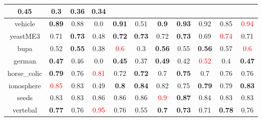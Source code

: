 \documentclass{article}%
\begin{document}
\begin{tabular}{c|cccccccccc}
{0.45
}&0.3&\textbf{0.36}&0.34\\%
\hline%
vehicle&\textbf{0.89}&0.88&0.0&\textbf{0.91}&0.51&\textbf{0.9}&\textbf{0.93}&0.92&0.85&\textcolor{red}{ 
0.94
}\\%
\hline%
yeastME3&0.71&\textbf{0.73}&0.48&\textbf{0.72}&\textbf{0.73}&0.72&\textbf{0.73}&0.69&\textcolor{red}{ 
0.74
}&0.71\\%
\hline%
bupa&0.52&\textbf{0.55}&0.38&\textcolor{red}{ 
0.6
}&0.3&\textbf{0.56}&0.55&\textbf{0.56}&0.57&\textcolor{red}{ 
0.6
}\\%
\hline%
german&\textbf{0.47}&0.46&0.0&\textbf{0.45}&0.37&\textbf{0.49}&0.42&\textcolor{red}{ 
0.52
}&0.4&\textbf{0.47}\\%
\hline%
horse\_colic&\textbf{0.79}&0.76&\textcolor{red}{ 
0.81
}&0.72&\textbf{0.72}&0.7&\textbf{0.75}&0.7&0.76&0.76\\%
\hline%
ionosphere&\textcolor{red}{ 
0.85
}&0.83&0.49&\textbf{0.8}&\textbf{0.84}&0.82&0.75&\textbf{0.79}&0.79&\textbf{0.83}\\%
\hline%
seeds&0.83&0.83&0.86&0.86&0.86&\textcolor{red}{ 
0.9
}&\textbf{0.87}&0.84&0.83&0.83\\%
\hline%
vertebal&\textbf{0.77}&0.76&\textcolor{red}{ 
0.95
}&0.76&0.55&\textbf{0.7}&\textbf{0.73}&0.71&\textbf{0.78}&0.76\\%
\hline%
\end{tabular}

%
\end{document}
